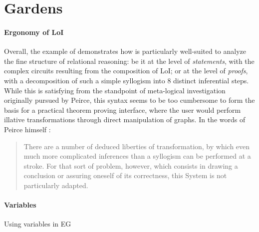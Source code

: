 \section{Gardens}

\paragraph{Ergonomy of LoI}

Overall, the example of  demonstrates how 
is particularly well-suited to analyze the fine structure of relational
reasoning: be it at the level of \emph{statements}, with the complex circuits
resulting from the composition of LoI; or at the level of \emph{proofs}, with a
decomposition of such a simple syllogism into 8 distinct inferential steps.
While this is satisfying from the standpoint of meta-logical investigation
originally pursued by Peirce, this syntax seems to be too cumbersome to form the
basis for a practical theorem proving interface, where the user would perform
illative transformations through direct manipulation of graphs. In the words of
Peirce himself \cite[p.~544]{peirce_prolegomena_1906}:
\begin{quote}
  There are a number of deduced liberties of transformation, by which even much
  more complicated inferences than a syllogism can be performed at a stroke. For
  that sort of problem, however, which consists in drawing a conclusion or
  assuring oneself of its correctness, this System is not particularly adapted.
\end{quote}

\paragraph{Variables}

\begin{marginfigure}
  \hspace{-3em}
  \caption{Using variables in EG}
\end{marginfigure}

